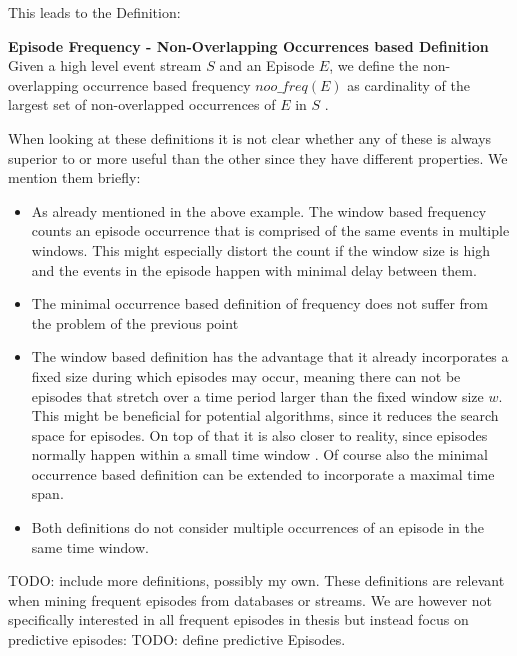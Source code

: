 This leads to the Definition:

\begin{mydef}
\textbf{Episode Frequency - Non-Overlapping Occurrences based Definition} Given a high level event stream $S$ and an Episode $E$, we define the non-overlapping occurrence based frequency $noo\_freq(E)$ as cardinality of the largest set of non-overlapped occurrences of $E$ in $S$ \cite{laxman2007fast}.
\end{mydef}



When looking at these definitions it is not clear whether any of these is always superior to or more useful than the other since they have different properties. We mention them briefly:

\begin{itemize}
	\item As already mentioned in the above example. The window based frequency counts an episode occurrence that is comprised of the same events in multiple windows. This might especially distort the count if the window size is high and the events in the episode happen with minimal delay between them.
	\item The minimal occurrence based definition of frequency does not suffer from the problem of the previous point
	\item The window based definition has the advantage that it already incorporates a fixed size during which episodes may occur, meaning there can not be episodes that stretch over a time period larger than the fixed window size $w$. This might be beneficial for potential algorithms, since it reduces the search space for episodes. On top of that it is also closer to reality, since episodes normally happen within a small time window \cite{generatingEpisodeDatasets}. Of course also the minimal occurrence based definition can be extended to incorporate a maximal time span.
	\item Both definitions do not consider multiple occurrences of an episode in the same time window.
\end{itemize}

TODO: include more definitions, possibly my own. \newline \newline
These definitions are relevant when mining frequent episodes from databases or streams. We are however not specifically interested in all frequent episodes in thesis but instead focus on predictive episodes: TODO: define predictive Episodes.





